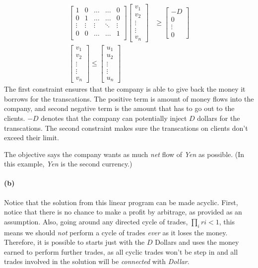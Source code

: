 \documentclass[12pt]{article}
\begin{document}
\begin{align*}
\begin{bmatrix}
1 & 0 & \dots & \dots & 0 \\
0 & 1 & \dots & \dots & 0 \\
\vdots & \vdots & \vdots & \ddots & \vdots \\
0 & 0 & \dots & \dots & 1 \\
\end{bmatrix} 
\begin{bmatrix}
v_1\\
v_2\\
\vdots\\
\vdots\\
v_n
\end{bmatrix} &\geq 
\begin{bmatrix}
-D\\
0\\
\vdots\\
0
\end{bmatrix} \\
\begin{bmatrix}
v_1\\
v_2\\
\vdots\\
\vdots\\
v_n
\end{bmatrix}  \leq 
\begin{bmatrix}
u_1\\
u_2\\
\vdots\\
\vdots\\
u_n
\end{bmatrix} &
\end{align*}
The first constraint ensures that the company is able to give back the money it borrows for the transcations. The positive term is amount of money flows into the company, and second negative term is the amount that has to go out to the clients. $-D$ denotes that the company can potentially inject $D$ dollars for the transcations. The second constraint makes sure the transcations on clients don't exceed their limit. 

The objective says the company wants as much \emph{net} flow of \emph{Yen} as possible. (In this example, \emph{Yen} is the second currency.)

\paragraph{(b)} Notice that the solution from this linear program can be made acyclic. First, notice that there is no chance to make a profit by arbitrage, as provided as an assumption. Also, going around any directed cycle of trades, $\prod_i ri < 1$, this means we should \emph{not} perform a cycle of trades \emph{ever} as it loses the money. Therefore, it is possible to starts just with the $D$ Dollars and uses the money earned to perform further trades, as all cyclic trades won't be step in and all trades involved in the solution will be \emph{connected} with \emph{Dollar}.
\end{document}
